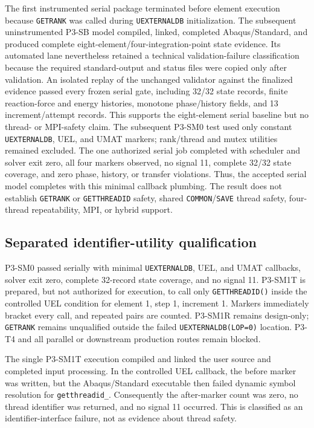 The first instrumented serial package terminated before element execution
because \texttt{GETRANK} was called during \texttt{UEXTERNALDB} initialization.
The subsequent uninstrumented P3-SB model compiled, linked, completed
Abaqus/Standard, and produced complete eight-element/four-integration-point
state evidence. Its automated lane nevertheless retained a technical
validation-failure classification because the required standard-output and
status files were copied only after validation. An isolated replay of the
unchanged validator against the finalized evidence passed every frozen serial
gate, including 32/32 state records, finite reaction-force and energy
histories, monotone phase/history fields, and 13 increment/attempt records.
This supports the eight-element serial baseline but no thread- or MPI-safety
claim. The subsequent P3-SM0 test used only constant \texttt{UEXTERNALDB},
UEL, and UMAT markers; rank/thread and mutex utilities remained excluded.
The one authorized serial job completed with scheduler and solver exit zero,
all four markers observed, no signal 11, complete 32/32 state coverage, and
zero phase, history, or transfer violations. Thus, the accepted serial model
completes with this minimal callback plumbing. The result does not establish
\texttt{GETRANK} or \texttt{GETTHREADID} safety, shared
\texttt{COMMON}/\texttt{SAVE} thread safety, four-thread repeatability, MPI,
or hybrid support.
\subsection{Separated identifier-utility qualification}
P3-SM0 passed serially with minimal \texttt{UEXTERNALDB}, UEL, and UMAT
callbacks, solver exit zero, complete 32-record state coverage, and no signal
11.  P3-SM1T is prepared, but not authorized for execution, to call only
\texttt{GETTHREADID()} inside the controlled UEL condition for element 1,
step 1, increment 1.  Markers immediately bracket every call, and repeated
pairs are counted.  P3-SM1R remains design-only; \texttt{GETRANK} remains
unqualified outside the failed \texttt{UEXTERNALDB(LOP=0)} location.  P3-T4
and all parallel or downstream production routes remain blocked.

The single P3-SM1T execution compiled and linked the user source and completed
input processing.  In the controlled UEL callback, the before marker was
written, but the Abaqus/Standard executable then failed dynamic symbol
resolution for \texttt{getthreadid\_}.  Consequently the after-marker count
was zero, no thread identifier was returned, and no signal 11 occurred.  This
is classified as an identifier-interface failure, not as evidence about
thread safety.

